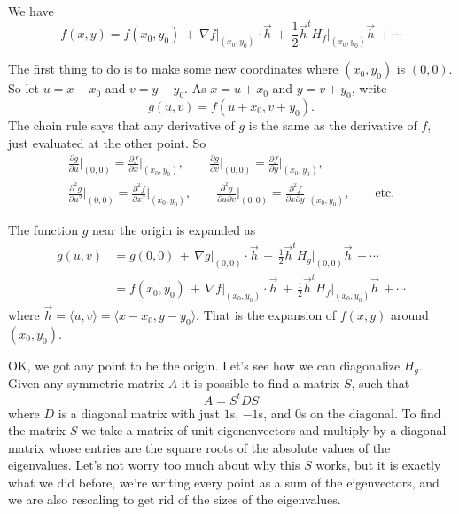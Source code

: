 \documentclass[12pt]{article}
\begin{document}
We have
$$
f(x,y) = f(x_0,y_0) \, + \,
\nabla f\big|_{(x_0,y_0)} \cdot \vec{h}
\, + \,
\frac{1}{2} \vec{h}^{t} H_f\big|_{(x_0,y_0)} \vec{h} \,
+ \cdots
$$

The first thing to do is to make some new coordinates where $(x_0,y_0)$ is
$(0,0)$.  So let $u = x-x_0$ and $v=y-y_0$.  As $x = u+x_0$ and $y = v+y_0$,
write
\begin{equation*}
g(u,v) = f(u+x_0,v+y_0).
\end{equation*}
The chain rule says that any derivative of $g$ is the same as the derivative
of $f$, just evaluated at the other point.  So
\begin{multline*}
\frac{\partial g}{\partial u}\Big|_{(0,0)} = 
\frac{\partial f}{\partial x}\Big|_{(x_0,y_0)}, \qquad
\frac{\partial g}{\partial v}\Big|_{(0,0)} = 
\frac{\partial f}{\partial y}\Big|_{(x_0,y_0)}, \\
\frac{\partial^2 g}{\partial u^2}\Big|_{(0,0)} = 
\frac{\partial^2 f}{\partial x^2}\Big|_{(x_0,y_0)}, \qquad
\frac{\partial^2 g}{\partial u \partial v}\Big|_{(0,0)} = 
\frac{\partial^2 f}{\partial x \partial y}\Big|_{(x_0,y_0)}, \qquad \text{etc.}
\end{multline*}

The function $g$ near the origin is expanded as
\begin{equation*}
\begin{split}
g(u,v) & = g(0,0) \, + \,
\nabla g\big|_{(0,0)} \cdot \vec{h}
\, + \,
\frac{1}{2} \vec{h}^{t} H_g\big|_{(0,0)} \vec{h} \,
+ \cdots
\\
& =
f(x_0,y_0) \, + \,
\nabla f\big|_{(x_0,y_0)} \cdot \vec{h}
\, + \,
\frac{1}{2} \vec{h}^{t} H_f\big|_{(x_0,y_0)} \vec{h} \,
+ \cdots
\end{split}
\end{equation*}
where $\vec{h} = \langle u,v \rangle = \langle x-x_0, y-y_0 \rangle$.
That is the expansion of $f(x,y)$ around $(x_0,y_0)$.

OK, we got any point to be the origin.  Let's see how we can diagonalize
$H_g$.  Given any symmetric matrix $A$ it is possible to find a matrix
$S$, such that
\begin{equation*}
A = S^t D S
\end{equation*}
where $D$ is a diagonal matrix with just $1$s, $-1$s, and $0$s on the
diagonal.  To find the matrix $S$ we take a matrix of unit eigenenvectors 
and multiply by a diagonal matrix whose entries are the square roots
of the absolute values of the eigenvalues.  Let's not worry too much about
why this $S$ works, but it is exactly what we did before, we're writing
every point as a sum of the eigenvectors, and we are also rescaling to
get rid of the sizes of the eigenvalues.
\end{document}
